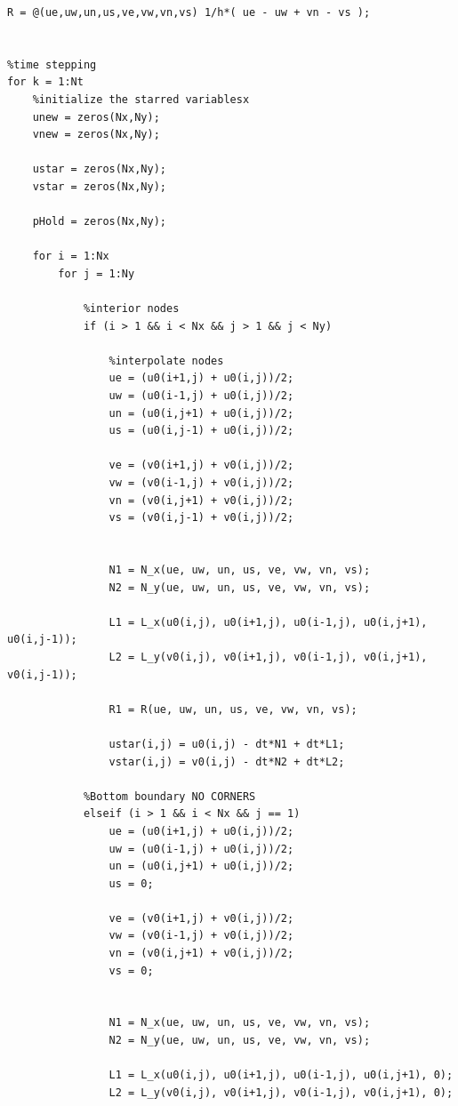 \documentclass{article}
\begin{document}
\begin{itemize}
\begin{center}
\begin{lstlisting}[style = Matlab-editor]
%RHS of pressure equation
R = @(ue,uw,un,us,ve,vw,vn,vs) 1/h*( ue - uw + vn - vs );


%time stepping
for k = 1:Nt
    %initialize the starred variablesx
    unew = zeros(Nx,Ny);
    vnew = zeros(Nx,Ny);

    ustar = zeros(Nx,Ny);
    vstar = zeros(Nx,Ny);

    pHold = zeros(Nx,Ny);
    
    for i = 1:Nx
        for j = 1:Ny
            
            %interior nodes
            if (i > 1 && i < Nx && j > 1 && j < Ny)

                %interpolate nodes 
                ue = (u0(i+1,j) + u0(i,j))/2;
                uw = (u0(i-1,j) + u0(i,j))/2;
                un = (u0(i,j+1) + u0(i,j))/2;
                us = (u0(i,j-1) + u0(i,j))/2;

                ve = (v0(i+1,j) + v0(i,j))/2;
                vw = (v0(i-1,j) + v0(i,j))/2;
                vn = (v0(i,j+1) + v0(i,j))/2;
                vs = (v0(i,j-1) + v0(i,j))/2;

                
                N1 = N_x(ue, uw, un, us, ve, vw, vn, vs);
                N2 = N_y(ue, uw, un, us, ve, vw, vn, vs);

                L1 = L_x(u0(i,j), u0(i+1,j), u0(i-1,j), u0(i,j+1), u0(i,j-1));
                L2 = L_y(v0(i,j), v0(i+1,j), v0(i-1,j), v0(i,j+1), v0(i,j-1));

                R1 = R(ue, uw, un, us, ve, vw, vn, vs);

                ustar(i,j) = u0(i,j) - dt*N1 + dt*L1;
                vstar(i,j) = v0(i,j) - dt*N2 + dt*L2;
                
            %Bottom boundary NO CORNERS
            elseif (i > 1 && i < Nx && j == 1)
                ue = (u0(i+1,j) + u0(i,j))/2;
                uw = (u0(i-1,j) + u0(i,j))/2;
                un = (u0(i,j+1) + u0(i,j))/2;
                us = 0;

                ve = (v0(i+1,j) + v0(i,j))/2;
                vw = (v0(i-1,j) + v0(i,j))/2;
                vn = (v0(i,j+1) + v0(i,j))/2;
                vs = 0;

                
                N1 = N_x(ue, uw, un, us, ve, vw, vn, vs);
                N2 = N_y(ue, uw, un, us, ve, vw, vn, vs);

                L1 = L_x(u0(i,j), u0(i+1,j), u0(i-1,j), u0(i,j+1), 0);
                L2 = L_y(v0(i,j), v0(i+1,j), v0(i-1,j), v0(i,j+1), 0);


\end{lstlisting}
\end{center}
\end{itemize}
\end{document}

